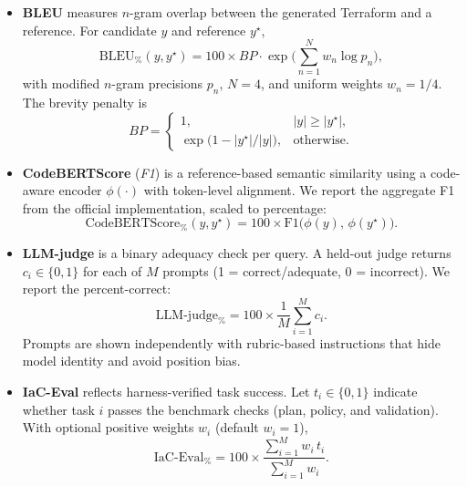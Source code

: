 \documentclass[manuscript,screen,nonacm]{acmart}
\begin{document}
\begin{itemize}
  \item \textbf{BLEU} measures $n$-gram overlap between the generated Terraform and a reference. For candidate $y$ and reference $y^\star$,
  \begin{equation}
    \mathrm{BLEU}_{\%}(y,y^\star) = 100 \times BP \cdot \exp\!\Bigg(\sum_{n=1}^{N} w_n \log p_n\Bigg),
  \end{equation}
  with modified $n$-gram precisions $p_n$, $N{=}4$, and uniform weights $w_n{=}1/4$. The brevity penalty is
  \begin{equation}
    BP =
    \begin{cases}
      1, & |y| \ge |y^\star|,\\[2pt]
      \exp\!\big(1 - {|y^\star|}/{|y|}\big), & \text{otherwise}.
    \end{cases}
  \end{equation}

  \item \textbf{CodeBERTScore} (\emph{F1}) is a reference-based semantic similarity using a code-aware encoder $\phi(\cdot)$ with token-level alignment. We report the aggregate F1 from the official implementation, scaled to percentage:
  \begin{equation}
    \mathrm{CodeBERTScore}_{\%}(y,y^\star) = 100 \times \mathrm{F1}\big(\phi(y),\,\phi(y^\star)\big).
  \end{equation}

  \item \textbf{LLM-judge} is a binary adequacy check per query. A held-out judge returns $c_i \in \{0,1\}$ for each of $M$ prompts (1 = correct/adequate, 0 = incorrect). We report the percent-correct:
  \begin{equation}
    \mathrm{LLM\text{-}judge}_{\%} = 100 \times \frac{1}{M}\sum_{i=1}^{M} c_i.
  \end{equation}
  Prompts are shown independently with rubric-based instructions that hide model identity and avoid position bias.

  \item \textbf{IaC-Eval} reflects harness-verified task success. Let $t_i \in \{0,1\}$ indicate whether task $i$ passes the benchmark checks (plan, policy, and validation). With optional positive weights $w_i$ (default $w_i{=}1$),
  \begin{equation}
    \mathrm{IaC\text{-}Eval}_{\%} = 100 \times \frac{\sum_{i=1}^{M} w_i\, t_i}{\sum_{i=1}^{M} w_i}.
  \end{equation}
\end{itemize}
\end{document}
